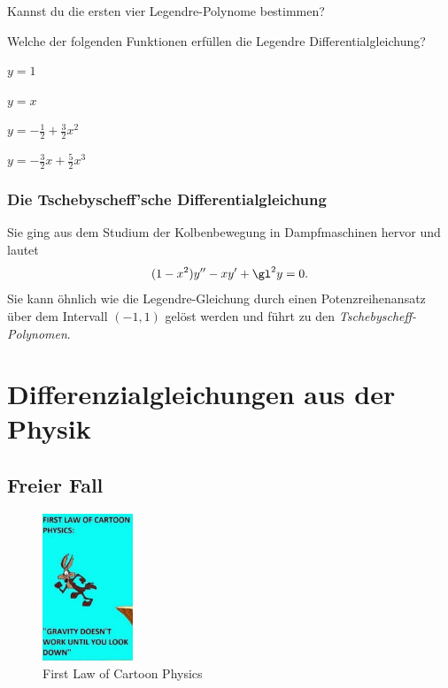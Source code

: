 \documentclass[%
11pt,%
twoside,%
titlepage,%
german,%
headsepline%
]{scrartcl}
\begin{document}
\begin{ueb}
Kannst du die ersten vier Legendre-Polynome bestimmen?
\end{ueb}

\begin{ueb}
Welche der folgenden Funktionen erf\"ullen die Legendre Differentialgleichung?

\begin{minipage}{0.3\textwidth}
\begin{enumeratea}
\item $y=1$
\item $y=x$
\end{enumeratea}
\end{minipage}
\begin{minipage}{0.4\textwidth}
\begin{enumeratea}
\setcounter{enumi}{2}
\item $y=-\frac{1}{2}+\frac{3}{2}x^2$
\item $y=-\frac{3}{2}x+\frac{5}{2}x^3$
\end{enumeratea}
\end{minipage}
\end{ueb}

\subsubsection{Die Tschebyscheff'sche Differentialgleichung}

Sie ging aus dem Studium der Kolbenbewegung in Dampfmaschinen hervor und lautet
$$(1-x^2)y''-xy'+\gl^2y=0.$$
Sie kann \"ohnlich wie die Legendre-Gleichung durch einen Potenzreihenansatz \"uber dem Intervall $(-1,1)$ gel\"ost werden und f\"uhrt zu den \emph{Tschebyscheff-Polynomen}.\\

\section{Differenzialgleichungen aus der Physik}
\subsection{Freier Fall}

\begin{figure}
\vspace{-35pt}
  \begin{center}
    \includegraphics[width=0.24\textwidth]{pictures/fall}
  \end{center}
\caption{First Law of Cartoon Physics}
\vspace{-35pt}
\end{figure}
\end{document}
